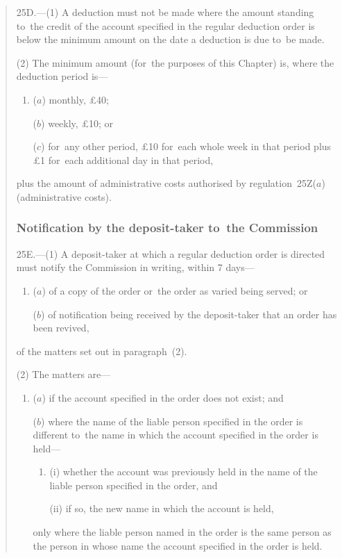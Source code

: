 \documentclass[12pt,a4paper]{article}
\begin{document}
\begin{quotation}
25D.---(1)  A deduction must not be made where the amount standing to~the credit of the account specified in the regular deduction order is below the minimum amount on the date a deduction is due to~be made.

(2) The minimum amount (for~the purposes of this Chapter) is, where the deduction period is—
\begin{enumerate}\item[]
($a$) monthly, £40;

($b$) weekly, £10; or

($c$) for~any other period, £10 for~each whole week in that period plus £1 for~each additional day in that period,
\end{enumerate}
plus the amount of administrative costs authorised by regulation~25Z($a$)  (administrative costs).

\subsubsection*{Notification by the deposit-taker to~the Commission}

25E.---(1)  A deposit-taker at which a regular deduction order is directed must notify the Commission in writing, within 7 days—
\begin{enumerate}\item[]
($a$) of a copy of the order or~the order as varied being served; or

($b$) of notification being received by the deposit-taker that an order has been revived,
\end{enumerate}
of the matters set out in paragraph~(2).

(2) The matters are—
\begin{enumerate}\item[]
($a$) if the account specified in the order does not exist; and

($b$) where the name of the liable person specified in the order is different to~the name in which the account specified in the order is held—
\begin{enumerate}\item[]
(i) whether the account was previously held in the name of the liable person specified in the order, and

(ii) if so, the new name in which the account is held,
\end{enumerate}
only where the liable person named in the order is the same person as the person in whose name the account specified in the order is held.
\end{enumerate}


\end{quotation}
\end{document}

